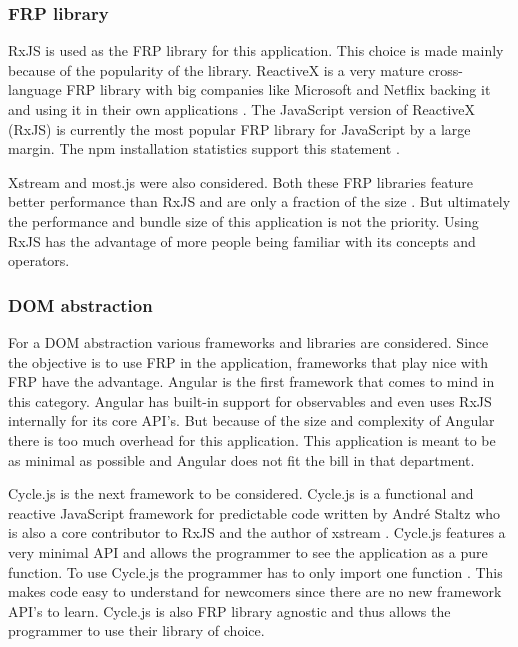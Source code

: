 \subsubsection{FRP library}

RxJS is used as the FRP library for this application. This choice is made mainly because of the popularity of the library. ReactiveX is a very mature cross-language FRP library with big companies like Microsoft and Netflix backing it and using it in their own applications \cite{rx}. The JavaScript version of ReactiveX (RxJS) is currently the most popular FRP library for JavaScript by a large margin. The npm installation statistics support this statement \cite{rx-npm}\cite{most-npm}\cite{xs-npm}.

Xstream and most.js were also considered. Both these FRP libraries feature better performance than RxJS and are only a fraction of the size \cite{rx-npm}\cite{most-npm}\cite{xs-npm}. But ultimately the performance and bundle size of this application is not the priority. Using RxJS has the advantage of more people being familiar with its concepts and operators.

\subsubsection{DOM abstraction}

For a DOM abstraction various frameworks and libraries are considered. Since the objective is to use FRP in the application, frameworks that play nice with FRP have the advantage. Angular is the first framework that comes to mind in this category. Angular has built-in support for observables and even uses RxJS internally for its core API's. But because of the size and complexity of Angular there is too much overhead for this application. This application is meant to be as minimal as possible and Angular does not fit the bill in that department.

Cycle.js is the next framework to be considered. Cycle.js is a functional and reactive JavaScript framework for predictable code \cite{cycle} written by André Staltz who is also a core contributor to RxJS and the author of xstream \cite{staltz}\cite{xs-npm}. Cycle.js features a very minimal API and allows the programmer to see the application as a pure function. To use Cycle.js the programmer has to only import one function . This makes code easy to understand for newcomers since there are no new framework API's to learn. Cycle.js is also FRP library agnostic and thus allows the programmer to use their library of choice.

